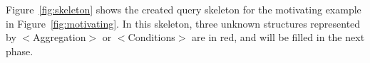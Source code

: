 Figure~\ref{fig:skeleton} shows the created query skeleton
for the motivating example in Figure~\ref{fig:motivating}.
In this skeleton,  three unknown structures represented by
$<$Aggregation$>$ or $<$Conditions$>$ are in red, and
will be filled in the next phase. 














